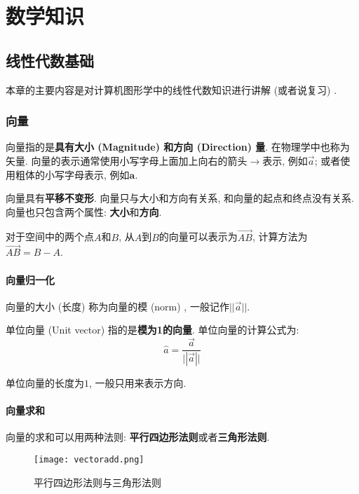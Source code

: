 \part{数学知识}

\chapter{线性代数基础}

本章的主要内容是对计算机图形学中的线性代数知识进行讲解 (或者说复习) . 

\section{向量}

向量指的是\textbf{具有大小 (Magnitude) 和方向 (Direction) 量}. 在物理学中也称为矢量. 向量的表示通常使用小写字母上面加上向右的箭头$\rightarrow$表示, 例如$\overrightarrow{a}$; 或者使用粗体的小写字母表示, 例如$\textbf{a}$. 

向量具有\textbf{平移不变形}. 向量只与大小和方向有关系, 和向量的起点和终点没有关系. 向量也只包含两个属性: \textbf{大小}和\textbf{方向}. 

对于空间中的两个点$A$和$B$, 从$A$到$B$的向量可以表示为$\overrightarrow{AB}$, 计算方法为$\overrightarrow{AB}=B-A$. 

\subsection{向量归一化}

向量的大小 (长度) 称为向量的模 (norm) , 一般记作$||\overrightarrow{a}||$. 

单位向量 (Unit vector) 指的是\textbf{模为1的向量}. 单位向量的计算公式为: 
\begin{equation}
\hat{a}=\frac{\overrightarrow{a}}{\big||\overrightarrow{a}|\big|}
\end{equation}

单位向量的长度为$1$, 一般只用来表示方向. 

\subsection{向量求和}
向量的求和可以用两种法则: \textbf{平行四边形法则}或者\textbf{三角形法则}. 

\begin{figure}[H]
  \centering
  \texttt{[image: vectoradd.png]}
  \caption{平行四边形法则与三角形法则}
  \label{fig:vectoradd}
\end{figure}

